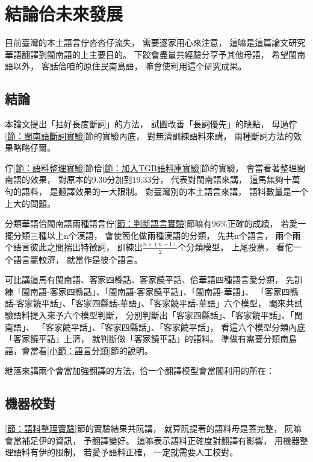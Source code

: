 \chapter{結論佮未來發展}
\label{章：結論佮未來發展}
目前臺灣的本土語言佇沓沓仔流失，
需要逐家用心來注意，
這嘛是這篇論文研究華語翻譯到閩南語的上主要目的。
下跤會盡量共經驗分享予其他母語，
希望閩南語以外，
客話佮咱的原住民南島語，
嘛會使利用這个研究成果。

\section{結論}
\label{節：結論}
本論文提出「拄好長度斷詞」的方法，
試圖改善「長詞優先」的缺點，
毋過佇\ref{節：閩南語斷詞實驗}節的實驗內底，
對無濟訓練語料來講，
兩種斷詞方法的效果略略仔爾。


佇\ref{節：語料整理實驗}節佮\ref{節：加入TGB語料庫實驗}節的實驗，
會當看著整理閩南語的效果，
對原本的9.30分加到19.33分，
代表對閩南語來講，
這馬無夠十萬句的語料，
是翻譯效果的一大限制。
對臺灣別的本土語言來講，
語料數量是一个上大的問題。

分類華語佮閩南語兩種語言佇\ref{節：判斷語言實驗}節嘛有$96\%$正確的成績，
若愛一擺分類三種以上n个漢語，
會使簡化做兩種漢語的分類，
先共n个語言，
兩个兩个語言彼此之間揣出特徵詞，
訓練出$\frac{n\times(n-1)}{2}$个分類模型，
上尾投票，
看佗一个語言贏較濟，
就當作是彼个語言。

可比講這馬有閩南語、客家四縣話、客家饒平話、佮華語四種語言愛分類，
先訓練「閩南語-客家四縣話」、「閩南語-客家饒平話」、「閩南語-華語」、
「客家四縣話-客家饒平話」、「客家四縣話-華語」、「客家饒平話-華語」六个模型，
閣來共試驗語料提入來予六个模型判斷，
分別判斷出「客家四縣話」、「客家饒平話」、「閩南語」、
「客家饒平話」、「客家四縣話」、「客家饒平話」，
看這六个模型分類內底「客家饒平話」上濟，
就判斷做「客家饒平話」的語料。
準做有需要分類南島語，會當看\ref{小節：語言分類}節的說明。

紲落來講兩个會當加強翻譯的方法，佮一个翻譯模型會當閣利用的所在：
\section{機器校對}
\label{節：鬥相共人工校對}

\ref{節：語料整理實驗}節的實驗結果共阮講，
就算阮提著的語料毋是蓋完整，
阮嘛會當補足伊的資訊，
予翻譯變好。
這嘛表示語料正確度對翻譯有影響，
用機器整理語料有伊的限制，
若愛予語料正確，
一定就需要人工校對。


